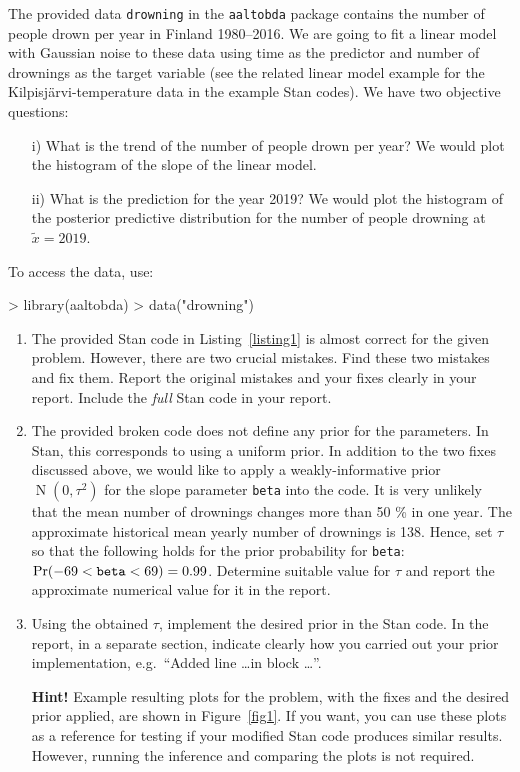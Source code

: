\documentclass[a4paper,11pt]{article}
\begin{document}
The provided data {\tt drowning} in the {\tt aaltobda} package contains the number of people drown per year in Finland 1980--2016.
%
We are going to fit a linear model with Gaussian noise to these data using time as the predictor and number of drownings as the target variable (see the related linear model example for the Kilpisjärvi-temperature data in the example Stan codes).
We have two objective questions:
\begin{itemize}
    \item [i)] What is the trend of the number of people drown per year? We would plot the histogram of the slope of the linear model.
    \item [ii)] What is the prediction for the year 2019? We would plot the histogram of the posterior predictive distribution for the number of people drowning at $\tilde x=2019$.
\end{itemize}

To access the data, use:

\begin{Schunk}
\begin{Sinput}
> library(aaltobda)
> data("drowning")
\end{Sinput}
\end{Schunk}


\begin{enumerate}

\item The provided Stan code in Listing~\ref{listing1} is almost correct for the given problem. However, there are two crucial mistakes. Find these two mistakes and fix them. Report the original mistakes and your fixes clearly in your report. Include the \emph{full} Stan code in your report.

\item The provided broken code does not define any prior for the parameters. In Stan, this corresponds to using a uniform prior. In addition to the two fixes discussed above, we would like to apply a weakly-informative prior $\operatorname{N}(0, \tau^2)$ for the slope parameter {\tt beta} into the code. It is very unlikely that the mean number of drownings changes more than 50 \% in one year. The approximate historical mean yearly number of drownings is 138. Hence, set $\tau$ so that the following holds for the prior probability for {\tt beta}: $\operatorname{Pr}(-69 < \text{{\tt beta}} < 69) = 0.99$. Determine suitable value for $\tau$ and report the approximate numerical value for it in the report. 
\item Using the obtained $\tau$, implement the desired prior in the Stan code. In the report, in a separate section, indicate clearly how you carried out your prior implementation, e.g.\ ``Added line \dots in block \dots''.

\textbf{Hint!} Example resulting plots for the problem, with the fixes and the desired prior applied, are shown in Figure~\ref{fig1}. If you want, you can use these plots as a reference for testing if your modified Stan code produces similar results. However, running the inference and comparing the plots is not required. 
\end{enumerate}
\end{document}
